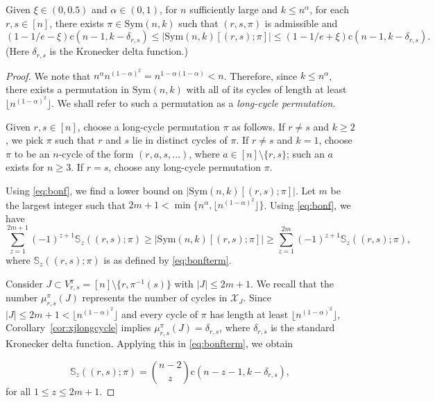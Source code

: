\documentclass[10pt,a4paper]{amsart}
\newcommand{\bb}{\mathbb}
\newcommand{\mcal}{\mathcal}
\newcommand{\st}{\mathrm{c}}
\newcommand{\sym}{\mathrm{Sym}}
\begin{document}
\begin{lem}\label{lem:HMlowerbound}
Given $\xi\in (0,0.5)$ and $\alpha \in (0,1)$, for $n$ sufficiently large and $k\leq n^{\alpha}$, for each  $r,s\in [n]$, there exists $\pi \in \sym(n,k)$ such that $(r,s,\pi)$ is admissible and 
\[(1-1/e -\xi)\st(n-1,k-\delta_{r,s}) \leq |\sym(n,k)[(r,s);\pi]| \leq (1-1/e +\xi)\st(n-1,k-\delta_{r,s}).\] (Here $\delta_{r,s}$ is the Kronecker delta function.)
\end{lem}

\begin{proof}
We note that $n^{\alpha} n^{(1-\alpha)^{2}}=n ^{1-\alpha(1-\alpha)}<n$.
Therefore, since $k\leq n^{\alpha}$, there exists a permutation in $\sym(n,k)$ with all of its cycles of length at least $\lfloor n^{(1-\alpha)^{2}} \rfloor$. We shall refer to such a permutation as a {\it long-cycle permutation}.

Given $r,s\in[n]$, choose a long-cycle permutation $\pi$ as follows. If $r\neq s$ and $k\geq 2$, we pick $\pi$ such that $r$ and $s$ lie in distinct cycles of $\pi$. If $r\neq s$ and $k=1$, choose $\pi$ to be an $n$-cycle of the form $(r,a,s,\ldots)$, where $a\in[n]\setminus \{r,s\}$; such an $a$ exists for $n\geq3$. If $r=s$, choose any long-cycle permutation $\pi$.

Using \eqref{eq:bonf}, we find a lower bound on $|\sym(n,k)[(r,s);\pi]|$. 
Let $m$ be the largest integer such that $2m+1 < \min\{n^{\alpha}, \lfloor n^{(1-\alpha)^{2}}\rfloor \}$. Using \eqref{eq:bonf}, we have 
\begin{equation}\label{eq:bonfineq}
\sum\limits_{z=1}^{2m+1} (-1)^{z+1}\bb{S}_{z}((r,s);\pi)\geq |\sym(n,k)[(r,s);\pi]| \geq \sum\limits_{z=1}^{2m} (-1)^{z+1}\bb{S}_{z}((r,s);\pi),
\end{equation}
 where $\bb{S}_{z}((r,s);\pi)$ is as defined by \eqref{eq:bonfterm}. 

Consider $J \subset V_{r,s}^{\pi}=[n]\setminus \{r,\pi^{-1}(s)\}$ with $|J|\leq 2m+1$. 
We recall that the number $\mu_{r,s}^{\pi}(J)$ represents the number of cycles in $\mcal{X}_{J}$. Since $|J|\leq 2m+1 <\lfloor n^{(1-\alpha)^{2}}\rfloor$ and every cycle of $\pi$ has length at least $\lfloor n^{(1-\alpha)^{2}}\rfloor$, Corollary~\ref{cor:xjlongcycle} implies $\mu_{r,s}^{\pi}(J)=\delta_{r,s}$, where $\delta_{r,s}$ is the standard Kronecker delta function. Applying this in \eqref{eq:bonfterm}, we obtain

\begin{equation}\label{eq:bonftermlongpermint}
\bb{S}_{z}((r,s);\pi) = \binom{n-2}{z} \st(n-z-1,k-\delta_{r,s}),
\end{equation}
for all $1\leq z\leq 2m+1$.


\end{proof}
\end{document}
